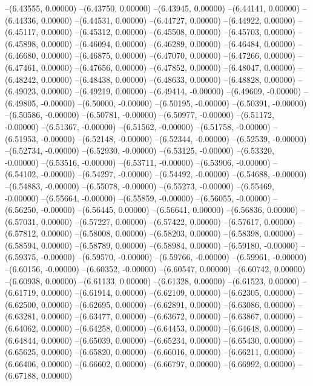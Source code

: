 --(6.43555, 0.00000)
--(6.43750, 0.00000)
--(6.43945, 0.00000)
--(6.44141, 0.00000)
--(6.44336, 0.00000)
--(6.44531, 0.00000)
--(6.44727, 0.00000)
--(6.44922, 0.00000)
--(6.45117, 0.00000)
--(6.45312, 0.00000)
--(6.45508, 0.00000)
--(6.45703, 0.00000)
--(6.45898, 0.00000)
--(6.46094, 0.00000)
--(6.46289, 0.00000)
--(6.46484, 0.00000)
--(6.46680, 0.00000)
--(6.46875, 0.00000)
--(6.47070, 0.00000)
--(6.47266, 0.00000)
--(6.47461, 0.00000)
--(6.47656, 0.00000)
--(6.47852, 0.00000)
--(6.48047, 0.00000)
--(6.48242, 0.00000)
--(6.48438, 0.00000)
--(6.48633, 0.00000)
--(6.48828, 0.00000)
--(6.49023, 0.00000)
--(6.49219, 0.00000)
--(6.49414, -0.00000)
--(6.49609, -0.00000)
--(6.49805, -0.00000)
--(6.50000, -0.00000)
--(6.50195, -0.00000)
--(6.50391, -0.00000)
--(6.50586, -0.00000)
--(6.50781, -0.00000)
--(6.50977, -0.00000)
--(6.51172, -0.00000)
--(6.51367, -0.00000)
--(6.51562, -0.00000)
--(6.51758, -0.00000)
--(6.51953, -0.00000)
--(6.52148, -0.00000)
--(6.52344, -0.00000)
--(6.52539, -0.00000)
--(6.52734, -0.00000)
--(6.52930, -0.00000)
--(6.53125, -0.00000)
--(6.53320, -0.00000)
--(6.53516, -0.00000)
--(6.53711, -0.00000)
--(6.53906, -0.00000)
--(6.54102, -0.00000)
--(6.54297, -0.00000)
--(6.54492, -0.00000)
--(6.54688, -0.00000)
--(6.54883, -0.00000)
--(6.55078, -0.00000)
--(6.55273, -0.00000)
--(6.55469, -0.00000)
--(6.55664, -0.00000)
--(6.55859, -0.00000)
--(6.56055, -0.00000)
--(6.56250, -0.00000)
--(6.56445, 0.00000)
--(6.56641, 0.00000)
--(6.56836, 0.00000)
--(6.57031, 0.00000)
--(6.57227, 0.00000)
--(6.57422, 0.00000)
--(6.57617, 0.00000)
--(6.57812, 0.00000)
--(6.58008, 0.00000)
--(6.58203, 0.00000)
--(6.58398, 0.00000)
--(6.58594, 0.00000)
--(6.58789, 0.00000)
--(6.58984, 0.00000)
--(6.59180, -0.00000)
--(6.59375, -0.00000)
--(6.59570, -0.00000)
--(6.59766, -0.00000)
--(6.59961, -0.00000)
--(6.60156, -0.00000)
--(6.60352, -0.00000)
--(6.60547, 0.00000)
--(6.60742, 0.00000)
--(6.60938, 0.00000)
--(6.61133, 0.00000)
--(6.61328, 0.00000)
--(6.61523, 0.00000)
--(6.61719, 0.00000)
--(6.61914, 0.00000)
--(6.62109, 0.00000)
--(6.62305, 0.00000)
--(6.62500, 0.00000)
--(6.62695, 0.00000)
--(6.62891, 0.00000)
--(6.63086, 0.00000)
--(6.63281, 0.00000)
--(6.63477, 0.00000)
--(6.63672, 0.00000)
--(6.63867, 0.00000)
--(6.64062, 0.00000)
--(6.64258, 0.00000)
--(6.64453, 0.00000)
--(6.64648, 0.00000)
--(6.64844, 0.00000)
--(6.65039, 0.00000)
--(6.65234, 0.00000)
--(6.65430, 0.00000)
--(6.65625, 0.00000)
--(6.65820, 0.00000)
--(6.66016, 0.00000)
--(6.66211, 0.00000)
--(6.66406, 0.00000)
--(6.66602, 0.00000)
--(6.66797, 0.00000)
--(6.66992, 0.00000)
--(6.67188, 0.00000)
